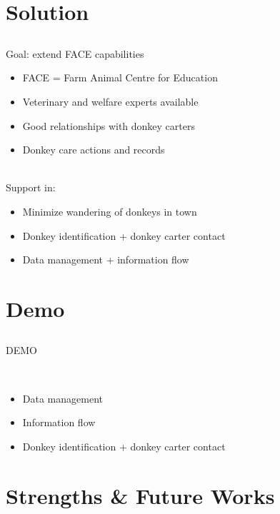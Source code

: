 \documentclass{beamer}
\begin{document}
\section{Solution}
\subsection{}

\begin{frame}
Goal: extend FACE capabilities
\begin{itemize}
 \item FACE = Farm Animal Centre for Education
 \pause
 \item Veterinary and welfare experts available
 \pause
 \item Good relationships with donkey carters
 \pause
 \item Donkey care actions and records
\end{itemize}
~\\
\pause
Support in:
\begin{itemize}
 \item Minimize wandering of donkeys in town
 \pause
 \item Donkey identification + donkey carter contact
 \pause
 \item Data management + information flow
\end{itemize}
\end{frame}

\section{Demo}
\subsection{}

\begin{frame}
\begin{center}
DEMO
\end{center}
~\\
\begin{itemize}
 \item Data management
 \pause
 \item Information flow
 \pause
 \item Donkey identification + donkey carter contact
\end{itemize}
\end{frame}

\section{Strengths \& Future Works}
\end{document}
